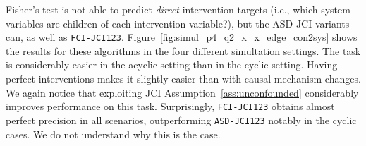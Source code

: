 \documentclass[twoside,11pt]{article}
\newcommand{\alg}[1]{\texttt{#1}}
\newcommand{\boldcap}[1]{\textbf{#1}}
\newcommand{\Joris}[1]{{\color{blue}#1}}
\begin{document}
\begin{comment}%
\begin{figure}[t]
\centerline{%
\texttt{[image: \{linear\_stochastic\_4\_2\_0.5\_0.5\_500\_1\_0\_ROC\_con2sys\_edge\_fci]}.png}
\texttt{[image: \{linear\_stochastic\_4\_2\_0.5\_0.5\_500\_1\_0\_PR1\_con2sys\_edge\_fci]}.png}
\texttt{[image: \{linear\_stochastic\_4\_2\_0.5\_0.5\_500\_1\_0\_PR0\_con2sys\_edge\_fci]}.png}
\texttt{[image: \{linear\_stochastic\_4\_2\_0.5\_0.5\_500\_1\_0\_LEG\_con2sys\_edge\_fci]}.png}
}
\centerline{%
\texttt{[image: \{linear\_stochastic\_4\_2\_0.5\_0.5\_500\_1\_1\_ROC\_con2sys\_edge\_fci]}.png}
\texttt{[image: \{linear\_stochastic\_4\_2\_0.5\_0.5\_500\_1\_1\_PR1\_con2sys\_edge\_fci]}.png}
\texttt{[image: \{linear\_stochastic\_4\_2\_0.5\_0.5\_500\_1\_1\_PR0\_con2sys\_edge\_fci]}.png}
\texttt{[image: \{linear\_stochastic\_4\_2\_0.5\_0.5\_500\_1\_1\_LEG\_con2sys\_edge\_fci]}.png}
}
\centerline{%
\texttt{[image: \{linear\_stochastic\_4\_2\_0.5\_0.5\_500\_0\_0\_ROC\_con2sys\_edge\_fci]}.png}
\texttt{[image: \{linear\_stochastic\_4\_2\_0.5\_0.5\_500\_0\_0\_PR1\_con2sys\_edge\_fci]}.png}
\texttt{[image: \{linear\_stochastic\_4\_2\_0.5\_0.5\_500\_0\_0\_PR0\_con2sys\_edge\_fci]}.png}
\texttt{[image: \{linear\_stochastic\_4\_2\_0.5\_0.5\_500\_0\_0\_LEG\_con2sys\_edge\_fci]}.png}
}
\centerline{%
\texttt{[image: \{linear\_stochastic\_4\_2\_0.5\_0.5\_500\_0\_1\_ROC\_con2sys\_edge\_fci]}.png}
\texttt{[image: \{linear\_stochastic\_4\_2\_0.5\_0.5\_500\_0\_1\_PR1\_con2sys\_edge\_fci]}.png}
\texttt{[image: \{linear\_stochastic\_4\_2\_0.5\_0.5\_500\_0\_1\_PR0\_con2sys\_edge\_fci]}.png}
\texttt{[image: \{linear\_stochastic\_4\_2\_0.5\_0.5\_500\_0\_1\_LEG\_con2sys\_edge\_fci]}.png}
}
\caption{\boldcap{Discovering direct intervention targets with FCI-JCI} on small models. From top to bottom: acyclic, causal mechanism changes; acyclic, perfect interventions; cyclic, causal mechanism changes; cyclic, perfect interventions. \Joris{TODO: remove cyclic fcijci123}\label{fig:simul_p4_q2_x_x_edge_con2sys_fci}}
\end{figure}
\end{comment}

Fisher's test is not able to predict \emph{direct} intervention targets (i.e., which system variables
are children of each intervention variable?), but the ASD-JCI variants can, as well as \alg{FCI-JCI123}.
Figure~\ref{fig:simul_p4_q2_x_x_edge_con2sys} shows the results for these algorithms in the four 
different simultation settings.
The task is considerably easier in the acyclic setting than in the cyclic setting. Having perfect interventions
makes it slightly easier than with causal mechanism changes. We again notice that
exploiting JCI Assumption~\ref{ass:unconfounded} considerably improves performance on this task.
Surprisingly, \alg{FCI-JCI123} obtains almost perfect precision in all scenarios, outperforming 
\alg{ASD-JCI123} notably in the cyclic cases. We do not understand why this is the case.
\end{document}
